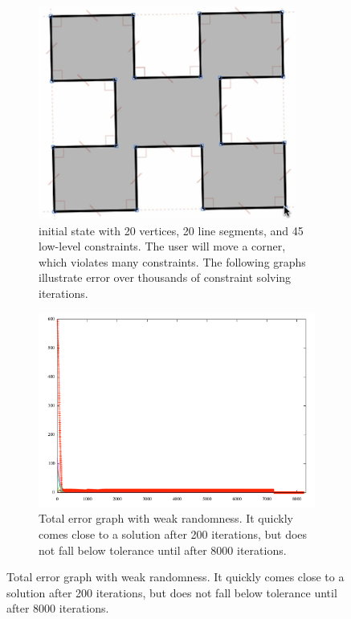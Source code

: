 \begin{landscape}
\begin{figure}
  \centering
  \begin{subfigure}[t]{0.6\textwidth}
    \centering
    \includegraphics[width=0.8\linewidth]{img/jessica-constraint-example.png}
    \caption{initial state with 20 vertices, 20 line segments,
      and 45 low-level constraints. The user will move a corner, which
      violates many constraints. The following graphs illustrate error
      over thousands of constraint solving iterations.}
    \label{fig:jessica-initial}
  \end{subfigure}
  \hspace{0.03\textwidth}
  \begin{subfigure}[t]{0.6\textwidth}
    \centering
    \includegraphics[width=0.8\linewidth]{img/jessica-norandom.pdf}
    \caption{Total error graph with weak randomness. It quickly comes
      close to a solution after 200 iterations, but does not fall
      below tolerance until after 8000 iterations.}
    \label{fig:jessica-norandom}
  \end{subfigure}


\end{figure}
\end{landscape}
